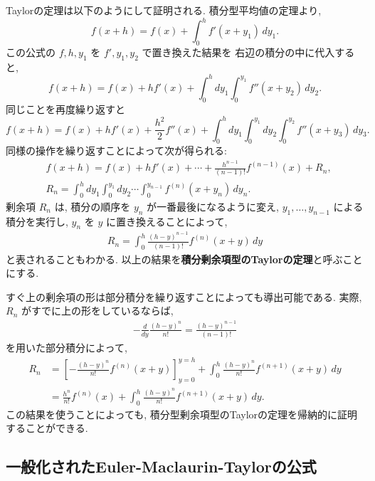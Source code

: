 \documentclass[12pt,twoside]{jarticle}
\newcommand\BF{\bfseries}
\theoremstyle{jplain}
\theoremstyle{jplain}
\theoremstyle{jplain}
\numberwithin{theorem}{section}
\numberwithin{equation}{section}
\numberwithin{figure}{section}
\numberwithin{table}{section}
\begin{document}
Taylorの定理は以下のようにして証明される. 積分型平均値の定理より,
\[
f(x+h) = f(x) + \int_0^h f'(x+y_1)\,dy_1.
\]
この公式の $f,h,y_1$ を $f',y_1,y_2$ で置き換えた結果を
右辺の積分の中に代入すると,
\[
f(x+h) = f(x) + h f'(x) + \int_0^h dy_1\int_0^{y_1} f''(x+y_2)\,dy_2.
\]
同じことを再度繰り返すと
\[
f(x+h)
= f(x) + h f'(x) + \frac{h^2}2 f''(x)
+ \int_0^h dy_1\int_0^{y_1}dy_2\int_0^{y_2} f''(x+y_3)\,dy_3.
\]
同様の操作を繰り返すことによって次が得られる:
\begin{align*}
  &
  f(x+h)=f(x)+hf'(x)+\cdots+\frac{h^{n-1}}{(n-1)!}f^{(n-1)}(x)+R_n,
  \\ &
  R_n =
  \int_0^h dy_1\int_0^{y_1}dy_2
  \cdots\int_0^{y_{n-1}}f^{(n)}(x+y_n)\,dy_n.
\end{align*}
剰余項 $R_n$ は, 積分の順序を $y_n$ が一番最後になるように変え,
$y_1,\ldots,y_{n-1}$ による積分を実行し,
$y_n$ を $y$ に置き換えることによって,
\begin{align*}
  R_n = \int_0^h \frac{(h-y)^{n-1}}{(n-1)!}f^{(n)}(x+y)\,dy
\end{align*}
と表されることもわかる.
以上の結果を{\BF 積分剰余項型のTaylorの定理}と呼ぶことにする.

すぐ上の剰余項の形は部分積分を繰り返すことによっても導出可能である.
実際, $R_n$ がすでに上の形をしているならば,
\begin{align*}
  -\frac{d}{dy}\frac{(h-y)^n}{n!} = \frac{(h-y)^{n-1}}{(n-1)!}
\end{align*}
を用いた部分積分によって,
\begin{align*}
  R_n
  &= \left[-\frac{(h-y)^n}{n!}f^{(n)}(x+y)\right]_{y=0}^{y=h}
  + \int_0^h \frac{(h-y)^n}{n!} f^{(n+1)}(x+y)\,dy
  \\
  & = \frac{h^n}{n!}f^{(n)}(x)
  + \int_0^h \frac{(h-y)^n}{n!} f^{(n+1)}(x+y)\,dy.
\end{align*}
この結果を使うことによっても,
積分型剰余項型のTaylorの定理を帰納的に証明することができる.




\subsection{一般化されたEuler-Maclaurin-Taylorの公式}
\end{document}
